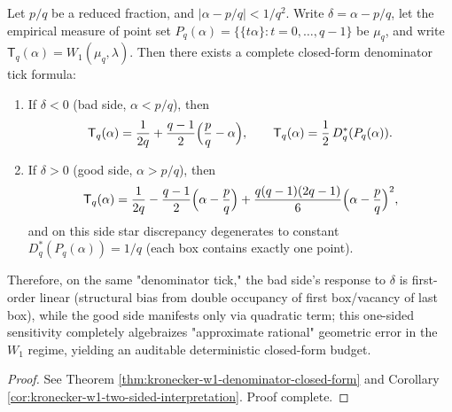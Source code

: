 \begin{conclusion}\label{con:xi-terminal-kronecker-w1-denominator-one-sided-sensitivity}
Let \(p/q\) be a reduced fraction, and \(|\alpha-p/q|<1/q^2\).
Write \(\delta=\alpha-p/q\), let the empirical measure of point set \(P_q(\alpha)=\{\{t\alpha\}:t=0,\dots,q-1\}\) be \(\mu_q\), and write
\(
\mathsf{T}_q(\alpha)=W_1(\mu_q,\lambda)
\).
Then there exists a complete closed-form denominator tick formula:
\begin{enumerate}
  \item If \(\delta<0\) (bad side, \(\alpha<p/q\)), then
  \[
  \mathsf{T}_q(\alpha)=\frac{1}{2q}+\frac{q-1}{2}\Bigl(\frac{p}{q}-\alpha\Bigr),
  \qquad
  \mathsf{T}_q(\alpha)=\frac12\,D_q^\ast(P_q(\alpha)).
  \]
  \item If \(\delta>0\) (good side, \(\alpha>p/q\)), then
  \[
  \mathsf{T}_q(\alpha)=\frac{1}{2q}-\frac{q-1}{2}\Bigl(\alpha-\frac{p}{q}\Bigr)
  +\frac{q(q-1)(2q-1)}{6}\Bigl(\alpha-\frac{p}{q}\Bigr)^2,
  \]
  and on this side star discrepancy degenerates to constant \(D_q^\ast(P_q(\alpha))=1/q\) (each box contains exactly one point).
\end{enumerate}
Therefore, on the same "denominator tick," the bad side's response to \(\delta\) is first-order linear (structural bias from double occupancy of first box/vacancy of last box), while the good side manifests only via quadratic term;
this one-sided sensitivity completely algebraizes "approximate rational" geometric error in the \(W_1\) regime, yielding an auditable deterministic closed-form budget.
\end{conclusion}
\begin{proof}[Proof]
See Theorem \ref{thm:kronecker-w1-denominator-closed-form} and Corollary \ref{cor:kronecker-w1-two-sided-interpretation}. Proof complete.
\end{proof}
